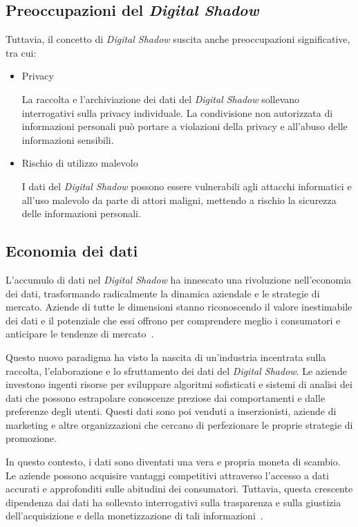 \subsection{Preoccupazioni del \emph{Digital Shadow}}

Tuttavia, il concetto di \emph{Digital Shadow} suscita anche preoccupazioni significative, tra cui:

\begin{itemize}
    \item Privacy
    
    La raccolta e l'archiviazione dei dati del \emph{Digital Shadow} sollevano interrogativi sulla privacy individuale. La condivisione non autorizzata di informazioni personali può portare a violazioni della privacy e all'abuso delle informazioni sensibili.
    
    \item Rischio di utilizzo malevolo
    
    I dati del \emph{Digital Shadow} possono essere vulnerabili agli attacchi informatici e all'uso malevolo da parte di attori maligni, mettendo a rischio la sicurezza delle informazioni personali.
\end{itemize}

\subsection{Economia dei dati}

L'accumulo di dati nel \emph{Digital Shadow} ha innescato una rivoluzione nell'economia dei dati, trasformando radicalmente la dinamica aziendale e le strategie di mercato. Aziende di tutte le dimensioni stanno riconoscendo il valore inestimabile dei dati e il potenziale che essi offrono per comprendere meglio i consumatori e anticipare le tendenze di mercato~\cite{Shadow, Shadow_economy}.

Questo nuovo paradigma ha visto la nascita di un'industria incentrata sulla raccolta, l'elaborazione e lo sfruttamento dei dati del \emph{Digital Shadow}. Le aziende investono ingenti risorse per sviluppare algoritmi sofisticati e sistemi di analisi dei dati che possono estrapolare conoscenze preziose dai comportamenti e dalle preferenze degli utenti. Questi dati sono poi venduti a inserzionisti, aziende di marketing e altre organizzazioni che cercano di perfezionare le proprie strategie di promozione.

In questo contesto, i dati sono diventati una vera e propria moneta di scambio. Le aziende possono acquisire vantaggi competitivi attraverso l'accesso a dati accurati e approfonditi sulle abitudini dei consumatori. Tuttavia, questa crescente dipendenza dai dati ha sollevato interrogativi sulla trasparenza e sulla giustizia dell'acquisizione e della monetizzazione di tali informazioni~\cite{Shadow_economy, Sell_data}.

